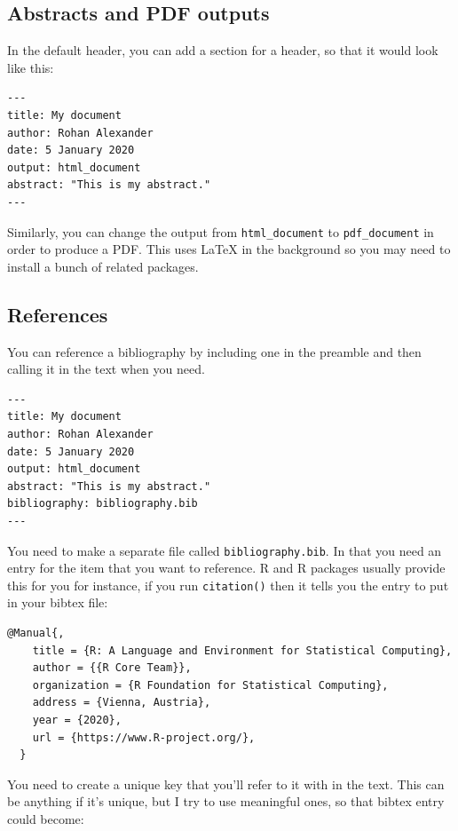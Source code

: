 \documentclass[
]{book}
\begin{document}
\hypertarget{abstracts-and-pdf-outputs}{%
\subsection{Abstracts and PDF outputs}\label{abstracts-and-pdf-outputs}}

In the default header, you can add a section for a header, so that it would look like this:

\begin{verbatim}
---
title: My document
author: Rohan Alexander
date: 5 January 2020
output: html_document
abstract: "This is my abstract."
---
\end{verbatim}

Similarly, you can change the output from \texttt{html\_document} to \texttt{pdf\_document} in order to produce a PDF. This uses LaTeX in the background so you may need to install a bunch of related packages.

\hypertarget{references}{%
\subsection{References}\label{references}}

You can reference a bibliography by including one in the preamble and then calling it in the text when you need.

\begin{verbatim}
---
title: My document
author: Rohan Alexander
date: 5 January 2020
output: html_document
abstract: "This is my abstract."
bibliography: bibliography.bib
---
\end{verbatim}

You need to make a separate file called \texttt{bibliography.bib}. In that you need an entry for the item that you want to reference. R and R packages usually provide this for you for instance, if you run \texttt{citation()} then it tells you the entry to put in your bibtex file:

\begin{verbatim}
@Manual{,
    title = {R: A Language and Environment for Statistical Computing},
    author = {{R Core Team}},
    organization = {R Foundation for Statistical Computing},
    address = {Vienna, Austria},
    year = {2020},
    url = {https://www.R-project.org/},
  }
\end{verbatim}

You need to create a unique key that you'll refer to it with in the text. This can be anything if it's unique, but I try to use meaningful ones, so that bibtex entry could become:
\end{document}
